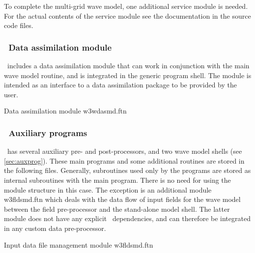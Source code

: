 \noindent
To complete the multi-grid wave model, one additional service module is
needed. For the actual contents of the service module see the documentation
in the source code files.

\begin{flist}
\end{flist}


\subsubsection{~Data assimilation module} \label{sec:data_ass}
\vsssub

\ww\ includes a data assimilation module that can work in conjunction with the
main wave model routine, and is integrated in the generic program shell. The
module is intended as an interface to a data assimilation package to be
provided by the user.

\vspace{\baselineskip} \noindent
Data assimilation module \hfill {\file w3wdasmd.ftn}

\begin{flisti}
\end{flisti}


\subsubsection{~Auxiliary programs} \label{sec:aux_mod}
\vsssub

\ww\ has several auxiliary pre- and post-processors, and two wave model shells
(see \para\ref{sec:auxprog}). These main programs and some additional routines
are stored in the following files. Generally, subroutines used only by the
programs are stored as internal subroutines with the main program. There is no
need for using the module structure in this case. The exception is an
additional module {\file w3fldsmd.ftn} which deals with the data flow of input
fields for the wave model between the field pre-processor and the stand-alone
model shell. The latter module does not have any explicit \ws\ dependencies,
and can therefore be integrated in any custom data pre-processor.



\vspace{\baselineskip} 
\noindent
Input data file management module \hfill {\file w3fldsmd.ftn}

